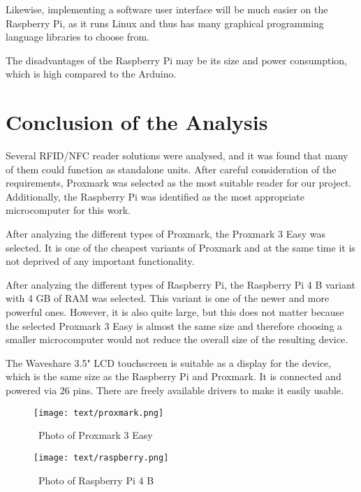 Likewise, implementing a software user interface will be much easier on the Raspberry Pi, as it runs Linux and thus has many graphical programming language libraries to choose from.  

The disadvantages of the Raspberry Pi may be its size and power consumption, which is high compared to the Arduino. 


\section{Conclusion of the Analysis}

Several RFID/NFC reader solutions were analysed, and it was found that many of them could function as standalone units. After careful consideration of the requirements, Proxmark was selected as the most suitable reader for our project. Additionally, the Raspberry Pi was identified as the most appropriate microcomputer for this work.

After analyzing the different types of Proxmark, the Proxmark 3 Easy was selected. It is one of the cheapest variants of Proxmark and at the same time it is not deprived of any important functionality.

After analyzing the different types of Raspberry Pi, the Raspberry Pi 4 B variant with 4 GB of RAM was selected. This variant is one of the newer and more powerful ones. However, it is also quite large, but this does not matter because the selected Proxmark 3 Easy is almost the same size and therefore choosing a smaller microcomputer would not reduce the overall size of the resulting device.

The Waveshare 3.5" LCD touchscreen is suitable as a display for the device, which is the same size as the Raspberry Pi and Proxmark. It is connected and powered via 26 pins. There are freely available drivers to make it easily usable.~\cite{waveshare35inch}

\begin{figure}[h]
    \centering
    \begin{minipage}[b]{0.45\textwidth}
        \centering
        \texttt{[image: text/proxmark.png]}
        \caption{~Photo of Proxmark 3 Easy}
        \label{fig:sub1}
    \end{minipage}
    \hfill
    \begin{minipage}[b]{0.45\textwidth}
        \centering
        \texttt{[image: text/raspberry.png]}
        \caption{~Photo of Raspberry Pi 4 B}
        \label{fig:sub2}
    \end{minipage}
    \label{fig:main}
\end{figure}